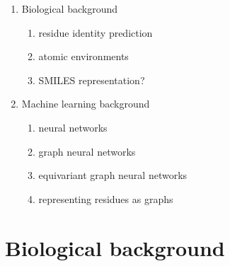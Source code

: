 {
    \color{red}
    \begin{enumerate}
        \item Biological background
        \begin{enumerate}
            \item residue identity prediction
            \item atomic environments 
            \item SMILES representation?
        \end{enumerate}
        \item Machine learning background
        \begin{enumerate}
            \item neural networks
            \item graph neural networks
            \item equivariant graph neural networks
            \item representing residues as graphs
        \end{enumerate}
    \end{enumerate}
}

\section{Biological background}
